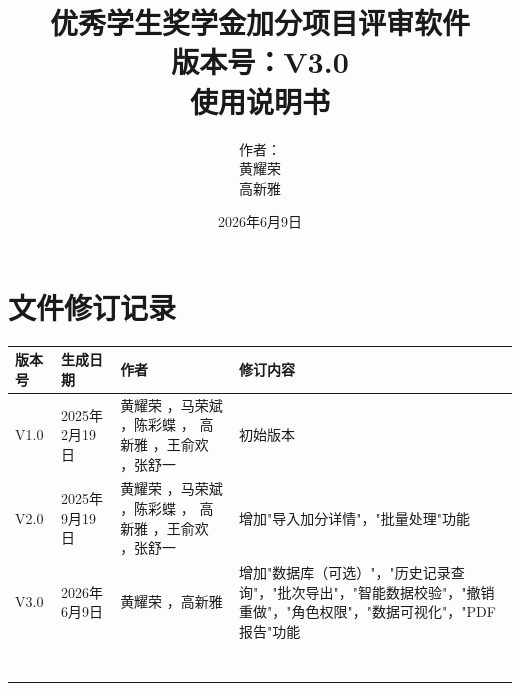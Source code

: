 \documentclass[12pt,openany]{report}
\begin{document}
	
	\title{\textbf{优秀学生奖学金加分项目评审软件}\\\textbf{版本号：V3.0}\\\textbf{使用说明书}}
	\author{作者：\\黄耀荣\\高新雅} 
	\date{2026年6月9日}    %
	\maketitle       %

	
	\setcounter{page}{1} %
	\tableofcontents      %
	
	\chapter*{文件修订记录}
	
\renewcommand{\arraystretch}{1.5} %

\begin{center}
	\begin{tabular}{ | m{1.5cm}<{\centering}|m{4cm}<{\centering} | m{5cm}<{\centering} | m{3.5cm}<{\centering} |}
		\hline
	版本号 & 生成日期 & 作者 & 修订内容 \\ %
	\hline
	V1.0 & 2025年2月19日 & 黄耀荣 ，马荣斌 ，陈彩蝶 ， 高新雅 ，王俞欢 ，张舒一 & 初始版本 \\ %
	\hline
	V2.0 & 2025年9月19日 & 黄耀荣 ，马荣斌 ，陈彩蝶 ， 高新雅 ，王俞欢 ，张舒一 & 增加"导入加分详情"，"批量处理"功能 \\ %
	\hline
	V3.0 & 2026年6月9日 & 黄耀荣 ，高新雅 & 增加"数据库（可选）"，"历史记录查询"，"批次导出"，"智能数据校验"，"撤销重做"，"角色权限"，"数据可视化"，"PDF报告"功能 \\ %
	\hline
	&  &  &  \\ %
	\hline
	&  &  &  \\ %
	\hline
	&  &  &  \\ %
	\hline
	&  &  &  \\ %
	\hline
		&  &  &  \\ %
	\hline
		&  &  &  \\ %
	\hline
		&  &  &  \\ %
	\hline
\end{tabular}
\end{center}





	

	
\end{document}
